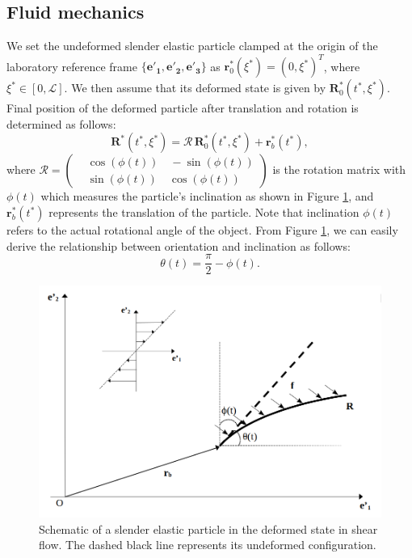 \documentclass[a4paper,12pt]{article}
\begin{document}
\subsection{Fluid mechanics}
We set the undeformed slender elastic particle clamped at the origin of the laboratory reference frame $\{\mathbf{e'_1}, \mathbf{e'_2}, \mathbf{e'_3}\}$ as
$\mathbf{r}_0^*(\xi^*)=(0,\xi^*)^T$, where $\xi^*\in [0,\mathcal{L}]$. We then assume that its deformed state is given by $\mathbf{R}_0^*(t^*,\xi^*)$. 
Final position of the deformed particle after translation and rotation is determined as follows:
\begin{equation}
	\label{eqn:19}
	\mathbf{R}^*(t^*,\xi^*)=\bm{\mathcal{R}}\,\mathbf{R}_0^*(t^*,\xi^*)+\mathbf{r}_b^*(t^*),
\end{equation}
where $\bm{\mathcal{R}}=\left(\begin{aligned}
	&\cos(\phi(t))\quad -\sin(\phi(t)) \\
	&\sin(\phi(t))\quad \cos(\phi(t))
\end{aligned}\right)$ is the rotation matrix with $\phi(t)$ which measures the particle's inclination as shown in Figure \ref{fig:5}, and $\textbf{r}_b^*(t^*)$ represents the translation of the particle. Note that inclination $\phi(t)$ refers to the actual rotational angle of the object. From Figure \ref{fig:5}, we can easily derive the relationship between orientation and inclination as follows:
\begin{equation}
	\label{eqn:20}
	\theta(t)=\frac{\pi}{2}-\phi(t).
\end{equation}
\begin{figure}[htb]
	\begin{center}
		\includegraphics[width=1\textwidth]{plot/fluid_general.png}
		\caption{Schematic of a slender elastic particle in the deformed state in shear flow. The dashed black line represents its undeformed configuration.}
		\label{fig:5}
	\end{center}
\end{figure}
\end{document}
